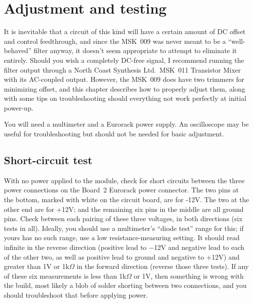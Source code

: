 
%
%
%
%
%
%

\chapter{Adjustment and testing}

It is inevitable that a circuit of this kind will have a certain amount of
DC offset and control feedthrough, and since the MSK~009 was never meant to
be a ``well-behaved'' filter anyway, it doesn't seem appropriate to attempt
to eliminate it entirely.  Should you wish a completely DC-free signal, I
recommend running the filter output through a North Coast Synthesis Ltd.\
MSK~011 Transistor Mixer with its AC-coupled output.  However, the MSK~009
does have two trimmers for minimizing offset, and this chapter describes how
to properly adjust them, along with some tips on troubleshooting should
everything not work perfectly at initial power-up.

You will need a multimeter and a Eurorack power supply.  An oscilloscope may
be useful for troubleshooting but should not be needed for basic adjustment.

\section{Short-circuit test}

With no power applied to the module, check for short circuits between the
three power connections on the Board~2 Eurorack power connector.  The two
pins at the bottom, marked with white on the circuit board, are for -12V. 
The two at the other end are for +12V; and the remaining six pins in the
middle are all ground pins.  Check between each pairing of these three
voltages, in both directions (six tests in all).  Ideally, you should use a
multimeter's ``diode test'' range for this; if yours has no such range, use
a low resistance-measuring setting. It should read infinite in the reverse
direction (positive lead to $-$12V and negative lead to each of the other
two, as well as positive lead to ground and negative to $+$12V) and greater
than 1V or 1k$\Omega$ in the forward direction (reverse those three
tests).  If any of these six measurements is less than 1k$\Omega$ or 1V,
then something is wrong with the build, most likely a blob of solder
shorting between two connections, and you should troubleshoot that before
applying power.

